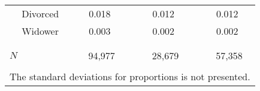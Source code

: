 \begin{table}[ht]
\begin{tabular}{llrrlrrlrr}
   & Divorced & 0.018 &  &  & 0.012 &  &  & 0.012 &  \\ 
   & Widower & 0.003 &  &  & 0.002 &  &  & 0.002 &  \\ 
    \\[-1.8ex] \hline \\[-1.8ex]  \multicolumn{2}{l}{ $ N $ }  &  \multicolumn{2}{c}{94,977} & & \multicolumn{2}{c}{28,679} & & \multicolumn{2}{c}{57,358} \\  \bottomrule   
 \\[-1.8ex] \multicolumn{10}{l}{\scriptsize{The standard deviations for proportions is 
               not presented.}} 
\end{tabular}
\end{table}

